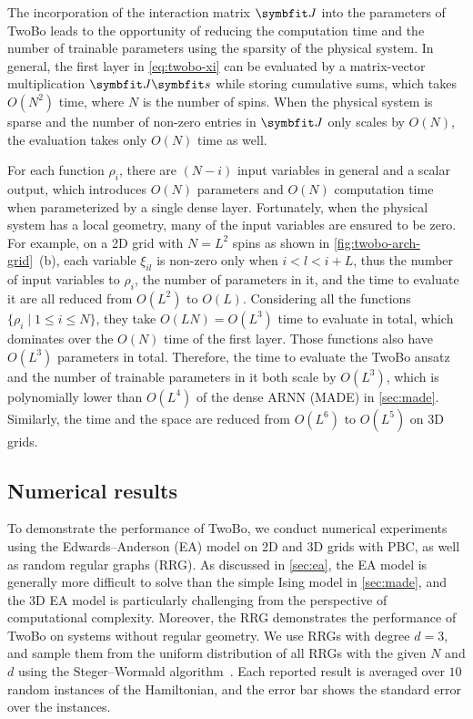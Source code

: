 The incorporation of the interaction matrix $\mJ$ into the parameters of TwoBo leads to the opportunity of reducing the computation time and the number of trainable parameters using the sparsity of the physical system. In general, the first layer in \cref{eq:twobo-xi} can be evaluated by a matrix-vector multiplication $\mJ \vs$ while storing cumulative sums, which takes $O(N^2)$ time, where $N$ is the number of spins. When the physical system is sparse and the number of non-zero entries in $\mJ$ only scales by $O(N)$, the evaluation takes only $O(N)$ time as well.

For each function $\rho_i$, there are $(N - i)$ input variables in general and a scalar output, which introduces $O(N)$ parameters and $O(N)$ computation time when parameterized by a single dense layer. Fortunately, when the physical system has a local geometry, many of the input variables are ensured to be zero. For example, on a 2D grid with $N = L^2$ spins as shown in \cref{fig:twobo-arch-grid}~(b), each variable $\xi_{i l}$ is non-zero only when $i < l < i + L$, thus the number of input variables to $\rho_i$, the number of parameters in it, and the time to evaluate it are all reduced from $O(L^2)$ to $O(L)$. Considering all the functions $\{\rho_i \mid 1 \le i \le N\}$, they take $O(L N) = O(L^3)$ time to evaluate in total, which dominates over the $O(N)$ time of the first layer. Those functions also have $O(L^3)$ parameters in total. Therefore, the time to evaluate the TwoBo ansatz and the number of trainable parameters in it both scale by $O(L^3)$, which is polynomially lower than $O(L^4)$ of the dense ARNN (MADE) in \cref{sec:made}. Similarly, the time and the space are reduced from $O(L^6)$ to $O(L^5)$ on 3D grids.

\subsection{Numerical results}

To demonstrate the performance of TwoBo, we conduct numerical experiments using the Edwards--Anderson (EA) model on 2D and 3D grids with PBC, as well as random regular graphs (RRG). As discussed in \cref{sec:ea}, the EA model is generally more difficult to solve than the simple Ising model in \cref{sec:made}, and the 3D EA model is particularly challenging from the perspective of computational complexity. Moreover, the RRG demonstrates the performance of TwoBo on systems without regular geometry. We use RRGs with degree $d = 3$, and sample them from the uniform distribution of all RRGs with the given $N$ and $d$ using the Steger--Wormald algorithm~\cite{steger1999generating}. Each reported result is averaged over $10$ random instances of the Hamiltonian, and the error bar shows the standard error over the instances.

